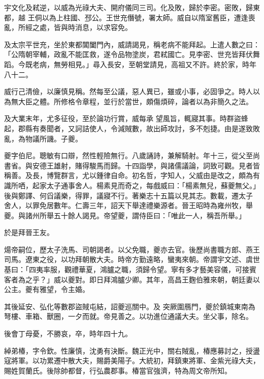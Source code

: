 \begin{pinyinscope}
 宇文化及弒逆，以威為光祿大夫、開府儀同三司。化及敗，歸於李密。密敗，歸東都，越
 王侗以為上柱國、邳公。王世充僭號，署太師。威自以隋室舊臣，遭逢喪亂，所經之處，皆與時消息，以求容免。



 及太宗平世充，坐於東都閶闔門內，威請謁見，稱老病不能拜起。上遣人數之曰：「公隋朝宰輔，政亂不能匡救，遂令品物塗炭，君弒國亡。見李密、世充皆拜伏舞蹈。今既老病，無勞相見。」尋入長安，至朝堂請見，高祖又不許。終於家，時年八十二。



 威行己清儉，以廉慎見稱。然每至公議，惡人異已，雖或小事，必固爭之。時人以為無大臣之體。所修格令章程，並行於當世，頗傷煩碎，論者以為非簡久之法。



 及大業末年，尤多征役，至於論功行賞，威每承
 望風旨，輒寢其事。時群盜蜂起，郡縣有奏聞者，又訶詰使人，令減賊數，故出師攻討，多不剋捷。由是遂致敗亂，為物議所譏。子夔。



 夔字伯尼。聰敏有口辯，然性輕險無行。八歲誦詩，兼解騎射。年十三，從父至尚書省。與安德王雄射，賭得駿馬而歸。十四詣學，與諸儒議論，詞致可觀。見者皆稱善。及長，博覽群言，尤以鍾律自命。初名哲，字知人，父威由是改之，頗為有識所哂，起家太子通事舍人。楊素見而奇之，每戲威曰：「楊素無兒，蘇夔無父。」後與鄭譯、何舀議樂，得罪，議寢不行。著樂志十五篇以見其志。數載，遷太子
 舍人，以罪免居數年。仁壽三年，詔天下舉達禮樂源者。晉王昭時為雍州牧，舉夔。與諸州所舉五十餘人謁見。帝望夔，謂侍臣曰：「唯此一人，稱吾所舉。」



 於是拜晉王友。



 煬帝嗣位，歷太子洗馬、司朝謁者。以父免職，夔亦去官。後歷尚書職方郎、燕王司馬。遼東之役，以功拜朝散大夫。時帝方勤遠略，蠻夷來朝。帝謂宇文述、虞世基曰：「四夷率服，觀禮華夏，鴻臚之職，須歸令望。寧有多才藝美容儀，可接賓客者為之乎？」威以夔對。即日拜鴻臚少卿。其年，高昌王麴伯雅來朝，朝廷妻以公主。夔有雅望，令主婚。



 其後延安、弘化等數郡盜賊屯結，詔夔巡關中。及
 突厥圍鴈門，夔於鎮城東南為弩樓、車箱、獸圈，一夕而就。帝見善之。以功進位通議大夫。坐父事，除名。



 後會丁母憂，不勝哀，卒，時年四十九。



 綽弟椿，字令欽。性廉慎，沈勇有決斷。魏正光中，關右賊亂，椿應募討之，授盪寇將軍。以功累遷中散大夫，賜爵美陽子。大統初，拜鎮東將軍、金紫光祿大夫，賜姓賀蘭氏。後除帥都督，行弘農郡事。椿當官強濟，特為周文帝所知。




\end{pinyinscope}
